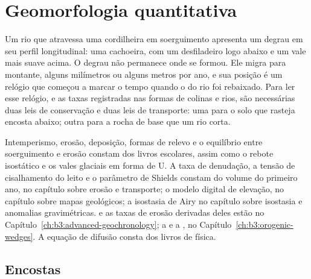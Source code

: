 \chapter{Geomorfologia quantitativa}\label{ch:b3:quantitative-geomorphology}

Um rio que atravessa uma cordilheira em soerguimento apresenta um degrau em seu perfil longitudinal: uma cachoeira,
com um desfiladeiro logo abaixo e um vale mais suave acima. O degrau não permanece
onde se formou. Ele migra para montante, alguns milímetros ou alguns metros por
ano, e sua posição é um relógio que começou a marcar o tempo quando o  do rio foi rebaixado.
Para ler esse relógio, e as taxas registradas nas formas de colinas
e rios, são necessárias duas leis de conservação e duas leis de transporte: uma para o
solo que rasteja encosta abaixo; outra para a rocha de base que um rio corta.

\begin{recall}
Intemperismo, erosão, deposição, formas de relevo e o equilíbrio entre soerguimento
e erosão constam dos livros escolares, assim como o rebote isostático e os vales
glaciais em forma de U. A taxa de denudação, a tensão de cisalhamento do leito e o
parâmetro de Shields constam do volume do primeiro ano, no capítulo sobre erosão e transporte;
o modelo digital de elevação, no capítulo sobre mapas geológicos; a isostasia de Airy
no capítulo sobre isostasia e anomalias gravimétricas.  e as
taxas de erosão derivadas deles estão no
Capítulo~\ref{ch:b3:advanced-geochronology}; a  e a
, no Capítulo~\ref{ch:b3:orogenic-wedges}. A
equação de difusão consta dos livros de física.
\end{recall}

\section{Encostas}\label{sec:b3:quantitative-geomorphology:hillslopes}

